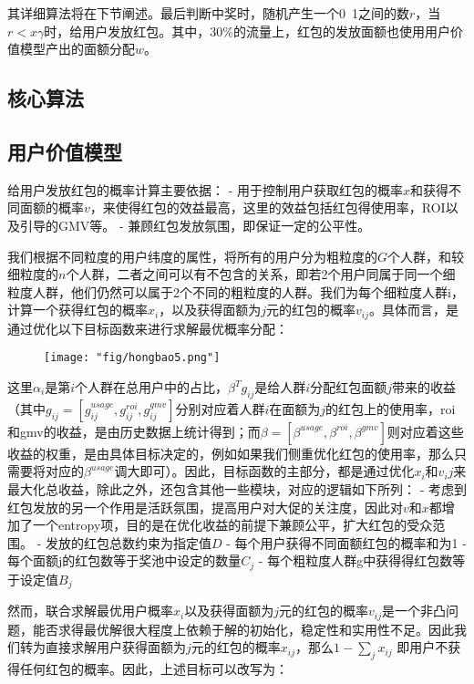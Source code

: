 其详细算法将在下节阐述。最后判断中奖时，随机产生一个0~1之间的数$r$，当$r<x\gamma$时，给用户发放红包。其中，30\%的流量上，红包的发放面额也使用用户价值模型产出的面额分配$w$。

\subsection{核心算法}
\subsection{用户价值模型 }
给用户发放红包的概率计算主要依据：
- 用于控制用户获取红包的概率$x$和获得不同面额的概率$v$，来使得红包的效益最高，这里的效益包括红包得使用率，ROI以及引导的GMV等。
- 兼顾红包发放氛围，即保证一定的公平性。

我们根据不同粒度的用户纬度的属性，将所有的用户分为粗粒度的$G$个人群，和较细粒度的$n$个人群，二者之间可以有不包含的关系，即若2个用户同属于同一个细粒度人群，他们仍然可以属于2个不同的粗粒度的人群。我们为每个细粒度人群i，计算一个获得红包的概率$x_i$，以及获得面额为$j$元的红包的概率$v_{ij}$。具体而言，是通过优化以下目标函数来进行求解最优概率分配：

\begin{figure}[!h]
	\centering
	\texttt{[image: "fig/hongbao5.png"]}
	\caption{}
	\label{fig:hongbao5}
\end{figure}

这里$\alpha_i$是第$i$个人群在总用户中的占比，$\beta^T g_{ij}$是给人群$i$分配红包面额$j$带来的收益（其中$g_{ij}=[g_{ij}^{usage},g_{ij}^{roi},g_{ij}^{gmv}]$分别对应着人群$i$在面额为$j$的红包上的使用率，roi和gmv的收益，是由历史数据上统计得到；而$\beta=[\beta^{usage},\beta^{roi},\beta^{gmv}]$则对应着这些收益的权重，是由具体目标决定的，例如如果我们侧重优化红包的使用率，那么只需要将对应的$\beta^{usage}$调大即可）。因此，目标函数的主部分，都是通过优化$x_i$和$v_ij$来最大化总收益，除此之外，还包含其他一些模块，对应的逻辑如下所列：
- 考虑到红包发放的另一个作用是活跃氛围，提高用户对大促的关注度，因此对$v$和$x$都增加了一个entropy项，目的是在优化收益的前提下兼顾公平，扩大红包的受众范围。
- 发放的红包总数约束为指定值$D$
- 每个用户获得不同面额红包的概率和为1
- 每个面额j的红包数等于奖池中设定的数量$C_j$
- 每个粗粒度人群g中获得得红包数等于设定值$B_j$

然而，联合求解最优用户概率$x_i$以及获得面额为$j$元的红包的概率$v_{ij}$是一个非凸问题，能否求得最优解很大程度上依赖于解的初始化，稳定性和实用性不足。因此我们转为直接求解用户获得面额为$j$元的红包的概率$x_{ij}$，那么$1-\sum_j x_{ij}$ 即用户不获得任何红包的概率。因此，上述目标可以改写为：

